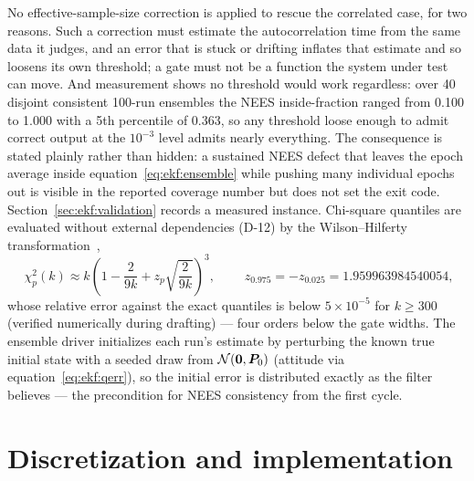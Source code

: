 No effective-sample-size correction is applied to rescue the correlated
case, for two reasons. Such a correction must estimate the
autocorrelation time from the same data it judges, and an error that is
stuck or drifting inflates that estimate and so loosens its own
threshold; a gate must not be a function the system under test can move.
And measurement shows no threshold would work regardless: over 40
disjoint consistent 100-run ensembles the NEES inside-fraction ranged
from 0.100 to 1.000 with a 5th percentile of 0.363, so any threshold
loose enough to admit correct output at the $10^{-3}$ level admits
nearly everything. The consequence is stated plainly rather than hidden:
a sustained NEES defect that leaves the epoch average inside
equation~\eqref{eq:ekf:ensemble} while pushing many individual epochs
out is visible in the reported coverage number but does not set the exit
code. Section~\ref{sec:ekf:validation} records a measured instance.
Chi-square quantiles are evaluated without external dependencies
(D-12) by the Wilson--Hilferty transformation~\cite{wilson1931},
\begin{equation}
  \boxed{\;
  \chi^2_p(k) \approx k \left( 1 - \frac{2}{9k}
    + z_p \sqrt{\frac{2}{9k}} \right)^{\!3},
  \;}
  \qquad
  z_{0.975} = -z_{0.025} = 1.959963984540054,
  \label{eq:ekf:wh}
\end{equation}
whose relative error against the exact quantiles is below
$5 \times 10^{-5}$ for $k \ge 300$ (verified numerically during
drafting) --- four orders below the gate widths. The ensemble driver
initializes each run's estimate by perturbing the known true initial
state with a seeded draw from $\mathcal{N}(\bm{0}, \bm{P}_0)$
(attitude via equation~\eqref{eq:ekf:qerr}), so the initial error is
distributed exactly as the filter believes --- the precondition for
NEES consistency from the first cycle.

\section{Discretization and implementation}
\label{sec:ekf:implementation}

